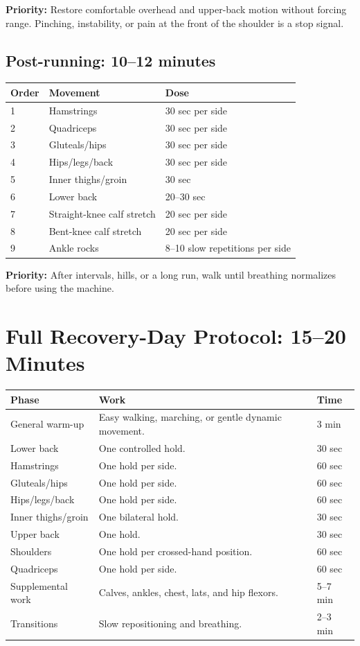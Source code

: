 \documentclass[10pt,letterpaper]{article}
\begin{document}
\textbf{Priority:} Restore comfortable overhead and upper-back motion without forcing range. Pinching, instability, or pain at the front of the shoulder is a stop signal.

\subsection{Post-running: 10--12 minutes}

\begin{tabularx}{\textwidth}{@{}C{0.5in}Y C{1.35in}@{}}
\toprule
{}
\color{white}\textbf{Order} & \color{white}\textbf{Movement} & \color{white}\textbf{Dose} \\
 & Hamstrings & 30 sec per side \\
2 & Quadriceps & 30 sec per side \\
3 & Gluteals/hips & 30 sec per side \\
4 & Hips/legs/back & 30 sec per side \\
5 & Inner thighs/groin & 30 sec \\
6 & Lower back & 20--30 sec \\
7 & Straight-knee calf stretch & 20 sec per side \\
8 & Bent-knee calf stretch & 20 sec per side \\
9 & Ankle rocks & 8--10 slow repetitions per side \\
\bottomrule
\end{tabularx}

\textbf{Priority:} After intervals, hills, or a long run, walk until breathing normalizes before using the machine.

\section{Full Recovery-Day Protocol: 15--20 Minutes}

\begin{tabularx}{\textwidth}{@{}L{1.42in}Y C{1.05in}@{}}
\toprule
{}
\color{white}\textbf{Phase} & \color{white}\textbf{Work} & \color{white}\textbf{Time} \\
\midrule
General warm-up & Easy walking, marching, or gentle dynamic movement. & 3 min \\
Lower back & One controlled hold. & 30 sec \\
Hamstrings & One hold per side. & 60 sec \\
Gluteals/hips & One hold per side. & 60 sec \\
Hips/legs/back & One hold per side. & 60 sec \\
Inner thighs/groin & One bilateral hold. & 30 sec \\
Upper back & One hold. & 30 sec \\
Shoulders & One hold per crossed-hand position. & 60 sec \\
Quadriceps & One hold per side. & 60 sec \\
Supplemental work & Calves, ankles, chest, lats, and hip flexors. & 5--7 min \\
Transitions & Slow repositioning and breathing. & 2--3 min \\
\bottomrule
\end{tabularx}
\end{document}
